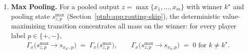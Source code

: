 \begin{theoremenv}
\begin{enumerate}
        from its other parents),
        \begin{align}
            \Gamma_x\!\bigl(s^{\mathrm{add}}_{z,p}\to s_{x_{\mathrm{op}},p}\bigr) \;=\;
            \tfrac12\,\Gamma_x\!\bigl(s^{\mathrm{add}}_{z,p}\bigr),
            \qquad
            \Gamma_x\!\bigl(s^{\mathrm{add}}_{z,p}\to s_{y_{\mathrm{op}},p}\bigr) \;=\;
            \tfrac12\,\Gamma_x\!\bigl(s^{\mathrm{add}}_{z,p}\bigr),
        \end{align}
        so the operand pair carries the full addition-state mass with no duplication.
    \item \textbf{Max Pooling.} For a pooled output $z = \max\{x_1,\dots,x_m\}$ with winner $k^\star$ and
        pooling state $s_{z,p}^{\max}$ (Section~\ref{ptnb:app:routing-skip}), the deterministic
        value-maximizing transition concentrates all mass on the winner: for every player label $p \in
            \{+,-\}$,
        \begin{align}
            \Gamma_x\!\bigl(s^{\max}_{z,p}\to s_{x_{k^\star},p}\bigr) \;=\;
            \Gamma_x\!\bigl(s_{z,p}^{\max}\bigr),
            \qquad
            \Gamma_x\!\bigl(s^{\max}_{z,p}\to s_{x_{k},p}\bigr) \;=\; 0 \text{ for } k \neq k^\star.
        \end{align}
\end{enumerate}\end{theoremenv}

